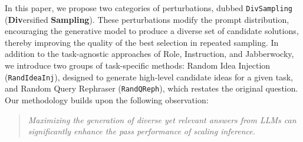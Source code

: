 \begin{table}[t]
\vspace{-0.1in}
    \centering
    \caption{\textbf{Effects of different injection strategies.} 10 solutions were generated using \texttt{gpt-3.5-turbo} for each strategy on the HumanEval benchmark.}
    \setlength\tabcolsep{1.1pt}
    \label{tab:apps_similarity}
    \vspace{-0.2in}
\end{table}

In this paper, we propose two categories of perturbations, dubbed \texttt{DivSampling} (\textbf{Div}ersified \textbf{Sampling}). These perturbations modify the prompt distribution, encouraging the generative model to produce a diverse set of candidate solutions, thereby improving the quality of the best selection in repeated sampling.
In addition to the task-agnostic approaches of Role, Instruction, and Jabberwocky, we introduce two groups of task-specific methods: Random Idea Injection (\texttt{RandIdeaInj}), designed to generate high-level candidate ideas for a given task, and Random Query Rephraser (\texttt{RandQReph}), which restates the original question. 
Our methodology builds upon the following observation:
\begin{quote}
\vspace{-0.1in}
\it{
Maximizing the generation of diverse yet relevant answers from LLMs can significantly enhance the pass performance of scaling inference.}
\end{quote}


